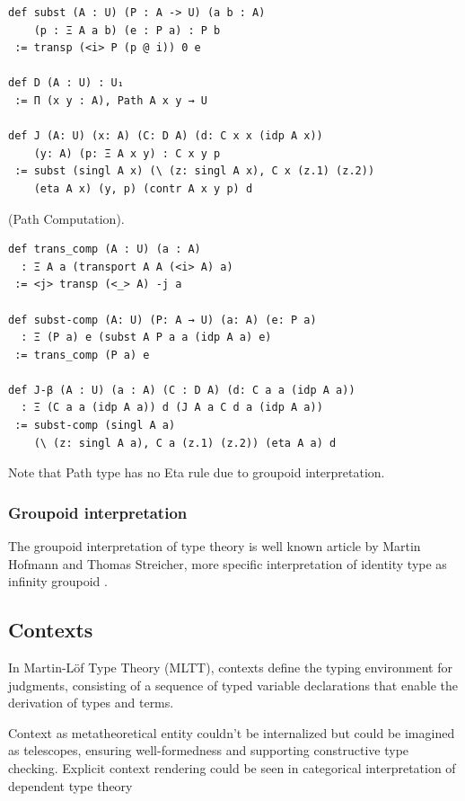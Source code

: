 \documentclass{article}
\begin{document}
\begin{theorem}
\begin{lstlisting}
def subst (A : U) (P : A -> U) (a b : A)
    (p : Ξ A a b) (e : P a) : P b
 := transp (<i> P (p @ i)) 0 e

def D (A : U) : U₁
 := Π (x y : A), Path A x y → U

def J (A: U) (x: A) (C: D A) (d: C x x (idp A x))
    (y: A) (p: Ξ A x y) : C x y p
 := subst (singl A x) (\ (z: singl A x), C x (z.1) (z.2))
    (eta A x) (y, p) (contr A x y p) d
\end{lstlisting}
\end{theorem}

\begin{theorem} (Path Computation).
\begin{lstlisting}
def trans_comp (A : U) (a : A)
  : Ξ A a (transport A A (<i> A) a)
 := <j> transp (<_> A) -j a

def subst-comp (A: U) (P: A → U) (a: A) (e: P a)
  : Ξ (P a) e (subst A P a a (idp A a) e)
 := trans_comp (P a) e

def J-β (A : U) (a : A) (C : D A) (d: C a a (idp A a))
  : Ξ (C a a (idp A a)) d (J A a C d a (idp A a))
 := subst-comp (singl A a)
    (\ (z: singl A a), C a (z.1) (z.2)) (eta A a) d
\end{lstlisting}
\end{theorem}

Note that Path type has no Eta rule due to groupoid interpretation.

\subsubsection*{Groupoid interpretation}
The groupoid interpretation of type theory is well known article by Martin Hofmann and Thomas Streicher,
more specific interpretation of identity type as infinity groupoid \cite{Hofmann96}.

\subsection*{Contexts}
In Martin-Löf Type Theory (MLTT), contexts define the typing
environment for judgments, consisting of a sequence of typed
variable declarations that enable the derivation of types and
terms.

Context as metatheoretical entity couldn't be internalized but could be
imagined as telescopes, ensuring well-formedness and supporting
constructive type checking. Explicit context rendering could be
seen in categorical interpretation of dependent type theory
\end{document}
